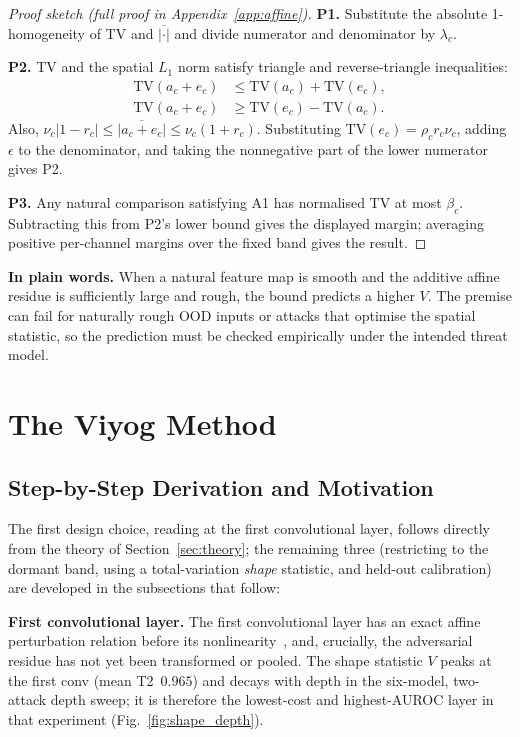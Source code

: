 \documentclass[10pt,letterpaper,journal]{IEEEtran}
\begin{document}
\begin{proof}[Proof sketch (full proof in Appendix~\ref{app:affine})]
\textbf{P1.} Substitute the absolute 1-homogeneity of TV and
$\overline{|\cdot|}$ and divide numerator and denominator by $\lambda_c$.

\textbf{P2.} TV and the spatial $L_1$ norm satisfy triangle and reverse-triangle
inequalities:
\begin{align*}
\mathrm{TV}(a_c+e_c)&\le\mathrm{TV}(a_c)+\mathrm{TV}(e_c),\\
\mathrm{TV}(a_c+e_c)&\ge\mathrm{TV}(e_c)-\mathrm{TV}(a_c).
\end{align*}
Also,
$\nu_c|1-r_c|\le\overline{|a_c+e_c|}\le\nu_c(1+r_c)$.
Substituting $\mathrm{TV}(e_c)=\rho_c r_c\nu_c$, adding $\epsilon$ to
the denominator, and taking the nonnegative part of the lower numerator gives
P2.

\textbf{P3.} Any natural comparison satisfying A1 has normalised TV at most
$\beta_c$. Subtracting this from P2's lower bound gives the displayed margin;
averaging positive per-channel margins over the fixed band gives the result.
\end{proof}

\noindent\textbf{In plain words.} When a natural feature map is smooth and the
additive affine residue is sufficiently large and rough, the bound predicts a
higher $V$. The premise can fail for naturally rough OOD inputs or attacks that
optimise the spatial statistic, so the prediction must be checked empirically
under the intended threat model.

\section{The Viyog Method}
\label{sec:method}

\subsection{Step-by-Step Derivation and Motivation}
The first design choice, reading at the first convolutional
layer, follows directly from the theory of Section~\ref{sec:theory}; the
remaining three (restricting to the dormant band, using a total-variation
\emph{shape} statistic, and held-out calibration) are developed in the
subsections that follow:

\noindent\textbf{First convolutional layer.} The first
convolutional layer has an exact affine perturbation relation before its
nonlinearity~\cite{bakiskan2022early,FLOD}, and, crucially, the adversarial residue
has not yet been transformed or pooled.  The shape statistic $V$ peaks at the
first conv (mean T2~$0.965$) and decays with depth in the six-model, two-attack
depth sweep; it is therefore the lowest-cost and highest-AUROC layer in that
experiment (Fig.~\ref{fig:shape_depth}).
\end{document}
